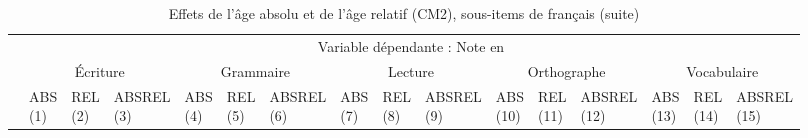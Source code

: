 \documentclass[
]{book}
\begin{document}
\begin{ThreePartTable}
\begin{longtable}[t]{llllllllllllllll}
\midrule
\endfirsthead
\caption[]{\label{tab:agemodelsrelssitemsfrench}Effets de l'âge absolu et de l'âge relatif (CM2), sous-items de français (suite)}\\
\toprule
\multicolumn{1}{c}{} & \multicolumn{15}{c}{Variable dépendante : Note en } \\
\cmidrule(l{3pt}r{3pt}){2-16}
\multicolumn{1}{c}{} & \multicolumn{3}{c}{Écriture} & \multicolumn{3}{c}{Grammaire} & \multicolumn{3}{c}{Lecture} & \multicolumn{3}{c}{Orthographe} & \multicolumn{3}{c}{Vocabulaire} \\
\cmidrule(l{3pt}r{3pt}){2-4} \cmidrule(l{3pt}r{3pt}){5-7} \cmidrule(l{3pt}r{3pt}){8-10} \cmidrule(l{3pt}r{3pt}){11-13} \cmidrule(l{3pt}r{3pt}){14-16}
 & \makecell{ABS \\ (1) } & \makecell{REL \\ (2) } & \makecell{ABSREL \\ (3) } & \makecell{ABS \\ (4) } & \makecell{REL \\ (5) } & \makecell{ABSREL \\ (6) } & \makecell{ABS \\ (7) } & \makecell{REL \\ (8) } & \makecell{ABSREL \\ (9) } & \makecell{ABS \\ (10) } & \makecell{REL \\ (11) } & \makecell{ABSREL \\ (12) } & \makecell{ABS \\ (13) } & \makecell{REL \\ (14) } & \makecell{ABSREL \\ (15) }\\
\midrule
\endhead


\end{longtable}
\end{ThreePartTable}
\end{document}
